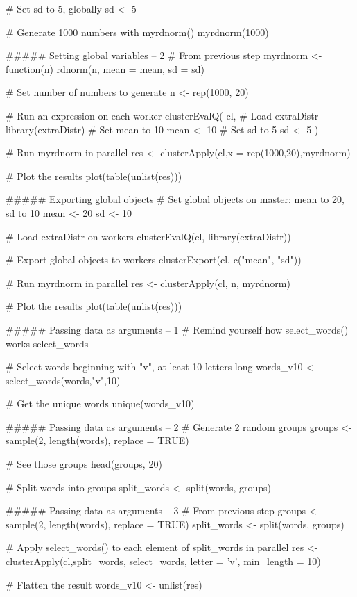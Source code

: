 # Set sd to 5, globally
sd <- 5

# Generate 1000 numbers with myrdnorm()
myrdnorm(1000)



##### Setting global variables -- 2
# From previous step
myrdnorm <- function(n) {
  rdnorm(n, mean = mean, sd = sd)
}

# Set number of numbers to generate
n <- rep(1000, 20)

# Run an expression on each worker
clusterEvalQ(
  cl, {
    # Load extraDistr
    library(extraDistr)
    # Set mean to 10
    mean <- 10
    # Set sd to 5
    sd <- 5
})

# Run myrdnorm in parallel
res <- clusterApply(cl,x = rep(1000,20),myrdnorm)

# Plot the results
plot(table(unlist(res)))


#####   Exporting global objects
# Set global objects on master: mean to 20, sd to 10
mean <- 20
sd <- 10

# Load extraDistr on workers
clusterEvalQ(cl, library(extraDistr))

# Export global objects to workers
clusterExport(cl, c("mean", "sd"))

# Run myrdnorm in parallel
res <- clusterApply(cl, n, myrdnorm)

# Plot the results
plot(table(unlist(res)))



##### Passing data as arguments -- 1
# Remind yourself how select_words() works
select_words

# Select words beginning with "v", at least 10 letters long
words_v10 <- select_words(words,"v",10)

# Get the unique words
unique(words_v10)


##### Passing data as arguments -- 2
# Generate 2 random groups
groups <- sample(2, length(words), replace = TRUE)

# See those groups
head(groups, 20)

# Split words into groups
split_words <- split(words, groups)


##### Passing data as arguments -- 3
# From previous step
groups <- sample(2, length(words), replace = TRUE)
split_words <- split(words, groups)
                      
# Apply select_words() to each element of split_words in parallel
res <- clusterApply(cl,split_words,  select_words, letter = 'v', min_length = 10)
 
# Flatten the result
words_v10 <- unlist(res)

